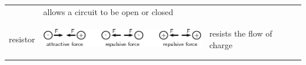 \begin{center}
\begin{xtabular*}{\mytablewidth}[t]{|p{10\mystarwidth}|p{10\mystarwidth}|p{10\mystarwidth}|}
                   &
    
    
        allows a circuit to be open or closed%
     \tabularnewline{}
    
    
        resistor &
    
    
        
                    
    \setcounter{subfigure}{0}

\label{m38771*id63001}
    \begin{center}
    \label{m38771*id63001!!!underscore!!!media}\label{m38771*id63001!!!underscore!!!printimage}\includegraphics{col11305.imgs/m38771_PG10C9_004.png} %
        
      \vspace{2pt}
    \vspace{.1in}
    
    \end{center}



    \addtocounter{footnote}{-0}
    
                   &
    
    
        resists the flow of charge%
     \tabularnewline{}
    

\end{xtabular*}
\end{center}
